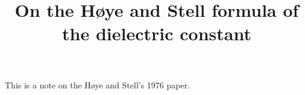 \documentclass[11pt]{article}
\begin{document}
\title{On the H\o ye and Stell formula of the dielectric constant}
\author{ \vspace{-10ex} }
\date{ \vspace{-10ex} }
\maketitle


This is a note on the H\o ye and Stell's 1976 paper\cite{hoye1976}.




\end{document}
